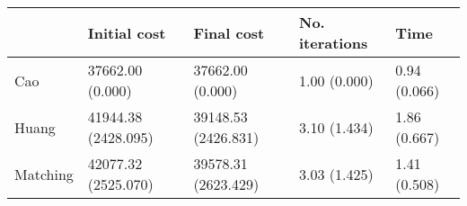 \begin{tabular}{lllll}
\toprule
{} &         Initial cost &           Final cost & No. iterations &          Time \\
\midrule
Cao      &     37662.00 (0.000) &     37662.00 (0.000) &   1.00 (0.000) &  0.94 (0.066) \\
Huang    &  41944.38 (2428.095) &  39148.53 (2426.831) &   3.10 (1.434) &  1.86 (0.667) \\
Matching &  42077.32 (2525.070) &  39578.31 (2623.429) &   3.03 (1.425) &  1.41 (0.508) \\
\bottomrule
\end{tabular}
